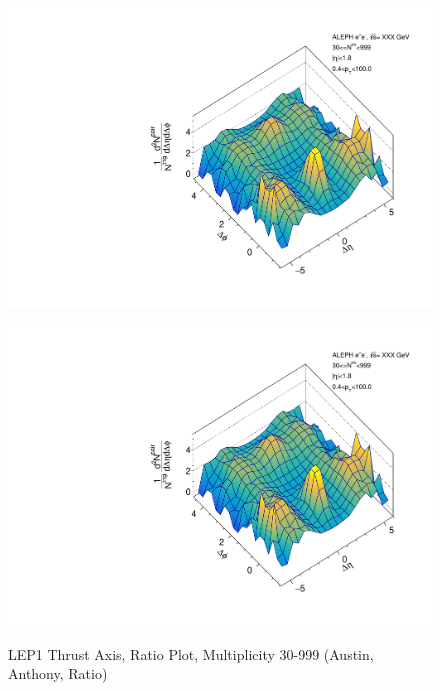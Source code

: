 \begin{figure}[htbp]
  \caption{LEP1 Thrust Axis, Ratio Plot, Multiplicity 30-999 (Austin, Anthony, Ratio)}
  \begin{minipage}[b]{0.32\linewidth}
    \centering
    \includegraphics[width=\linewidth]{images/TwoParticleCorrelation/LEP1_THRUST/LEP1_THRUST_ratio1_30_999.pdf}
    \label{fig:LEP1 Thrust Axis, Ratio Plot, Multiplicity 30-999, Austin}
  \end{minipage}
  \hspace{0.0cm}
  \begin{minipage}[b]{0.32\linewidth}
    \centering
    \includegraphics[width=\linewidth]{images/TwoParticleCorrelation/LEP1_THRUST/LEP1_THRUST_ratio2_30_999.pdf}
    \label{fig:LEP1 Thrust Axis, Ratio Plot, Multiplicity 30-999, Anthony}

\end{minipage}
\end{figure}
